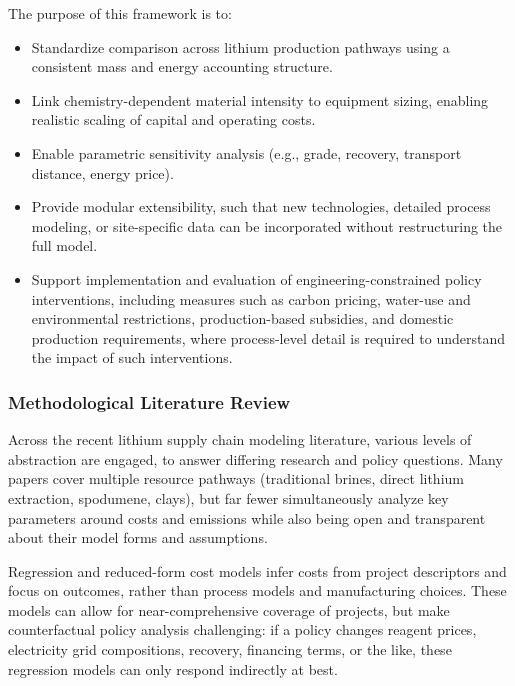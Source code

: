 The purpose of this framework is to:
\begin{itemize}
    \item Standardize comparison across lithium production pathways using a consistent mass and energy accounting structure.
    \item Link chemistry-dependent material intensity to equipment sizing, enabling realistic scaling of capital and operating costs.
    \item Enable parametric sensitivity analysis (e.g., grade, recovery, transport distance, energy price).
    \item Provide modular extensibility, such that new technologies, detailed process modeling, or site-specific data can be incorporated without restructuring the full model.
    \item Support implementation and evaluation of engineering-constrained policy interventions, including measures such as carbon pricing, water-use and environmental restrictions, production-based subsidies, and domestic production requirements, where process-level detail is required to understand the impact of such interventions.
\end{itemize}

\subsubsection{Methodological Literature Review}\label{app:04-methods-litreview}

Across the recent lithium supply chain modeling literature, various levels of abstraction are engaged, to answer differing research and policy questions. Many papers cover multiple resource pathways (traditional brines, direct lithium extraction, spodumene, clays), but far fewer simultaneously analyze key parameters around costs and emissions while also being open and transparent about their model forms and assumptions.

Regression and reduced-form cost models \citep[e.g.,][]{ambroseUnderstandingFutureLithium2020b, flemingLongrunAvailabilityMineral2024, buschEffectsDemandRecycling2025} infer costs from project descriptors and focus on outcomes, rather than process models and manufacturing choices. These models can allow for near-comprehensive coverage of projects, but make counterfactual policy analysis challenging: if a policy changes reagent prices, electricity grid compositions, recovery, financing terms, or the like, these regression models can only respond indirectly at best.

